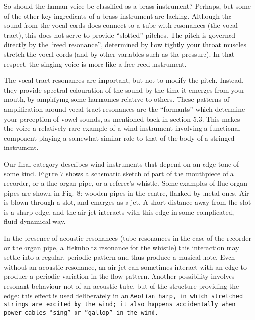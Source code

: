   So should the human voice be classified as a brass instrument? Perhaps, but 
  some of the other key ingredients of a brass instrument are lacking. Although 
  the sound from the vocal cords does connect to a tube with resonances (the 
  vocal tract), this does not serve to provide “slotted” pitches. The pitch is 
  governed directly by the “reed resonance”, determined by how tightly your 
  throat muscles stretch the vocal cords (and by other variables such as the 
  pressure). In that respect, the singing voice is more like a free reed 
  instrument. 

  The vocal tract resonances are important, but not to modify the pitch. 
  Instead, they provide spectral colouration of the sound by the time it 
  emerges from your mouth, by amplifying some harmonics relative to others. 
  These patterns of amplification around vocal tract resonances are the 
  “formants” which determine your perception of vowel sounds, as mentioned back 
  in section 5.3. This makes the voice a relatively rare example of a wind 
  instrument involving a functional component playing a somewhat similar role 
  to that of the body of a stringed instrument. 

  Our final category describes wind instruments that depend on an edge tone of 
  some kind. Figure 7 shows a schematic sketch of part of the mouthpiece of a 
  recorder, or a flue organ pipe, or a referee’s whistle. Some examples of flue 
  organ pipes are shown in Fig.\ 8: wooden pipes in the centre, flanked by 
  metal ones. Air is blown through a slot, and emerges as a jet. A short 
  distance away from the slot is a sharp edge, and the air jet interacts with 
  this edge in some complicated, fluid-dynamical way. 



  In the presence of acoustic resonances (tube resonances in the case of the 
  recorder or the organ pipe, a Helmholtz resonance for the whistle) this 
  interaction may settle into a regular, periodic pattern and thus produce a 
  musical note. Even without an acoustic resonance, an air jet can sometimes 
  interact with an edge to produce a periodic variation in the flow pattern. 
  Another possibility involves resonant behaviour not of an acoustic tube, but 
  of the structure providing the edge: this effect is used deliberately in an 
  \tt{}Aeolian harp\rm{}, in which stretched strings are excited by the wind; 
  it also happens accidentally when power cables “sing” or “gallop” in the 
  wind. 

